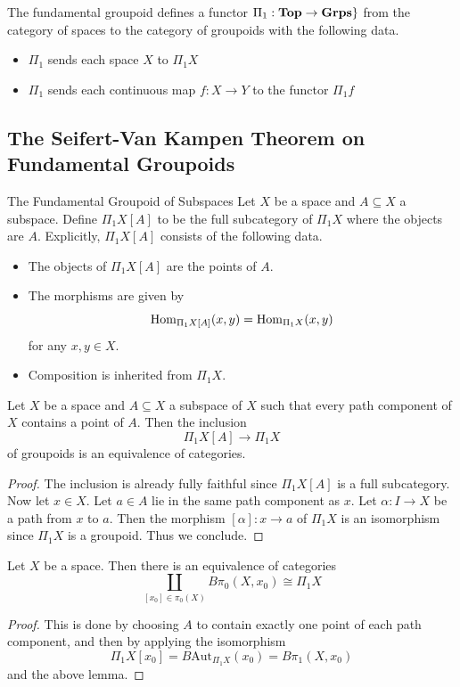 \documentclass[a4paper]{article}
\begin{document}
\begin{thm}{}{} The fundamental groupoid defines a functor $\Pi_1:\bold{Top}\to\bold{Grps}\}$ from the category of spaces to the category of groupoids with the following data. 
\begin{itemize}
\item $\Pi_1$ sends each space $X$ to $\Pi_1X$
\item $\Pi_1$ sends each continuous map $f:X\to Y$ to the functor $\Pi_1f$
\end{itemize}
\end{thm}

\subsection{The Seifert-Van Kampen Theorem on Fundamental Groupoids}
\begin{defn}{The Fundamental Groupoid of Subspaces}{} Let $X$ be a space and $A\subseteq X$ a subspace. Define $\Pi_1X[A]$ to be the full subcategory of $\Pi_1X$ where the objects are $A$. Explicitly, $\Pi_1X[A]$ consists of the following data. 
\begin{itemize}
\item The objects of $\Pi_1X[A]$ are the points of $A$. 
\item The morphisms are given by $$\operatorname{Hom}_{\Pi_1X[A]}(x,y)=\operatorname{Hom}_{\Pi_1X}(x,y)$$ for any $x,y\in X$. 
\item Composition is inherited from $\Pi_1X$. 
\end{itemize}
\end{defn}

\begin{lmm}{}{} Let $X$ be a space and $A\subseteq X$ a subspace of $X$ such that every path component of $X$ contains a point of $A$. Then the inclusion $$\Pi_1X[A]\to\Pi_1X$$ of groupoids is an equivalence of categories. \tcbline
\begin{proof}
The inclusion is already fully faithful since $\Pi_1X[A]$ is a full subcategory. Now let $x\in X$. Let $a\in A$ lie in the same path component as $x$. Let $\alpha:I\to X$ be a path from $x$ to $a$. Then the morphism $[\alpha]:x\to a$ of $\Pi_1X$ is an isomorphism since $\Pi_1X$ is a groupoid. Thus we conclude. 
\end{proof}
\end{lmm}

\begin{crl}{}{} Let $X$ be a space. Then there is an equivalence of categories $$\coprod_{[x_0]\in\pi_0(X)}B\pi_0(X,x_0)\cong\Pi_1X$$ \tcbline
\begin{proof}
This is done by choosing $A$ to contain exactly one point of each path component, and then by applying the isomorphism $$\Pi_1X[x_0]=B\text{Aut}_{\Pi_1X}(x_0)=B\pi_1(X,x_0)$$ and the above lemma. 
\end{proof}
\end{crl}
\end{document}
